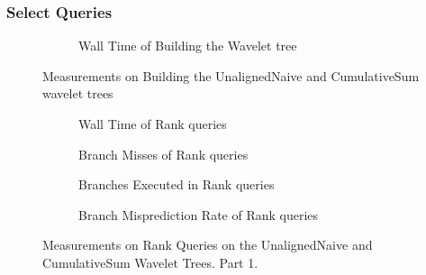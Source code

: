 \subsubsection{Select Queries}



\begin{figure}\tiny
\begin{subfigure}{0.48\textwidth}

\caption{Wall Time of Building the Wavelet tree}
\label{fig:CumulativeSumBuildWalltime}
\end{subfigure}
\caption{Measurements on Building the UnalignedNaive and CumulativeSum wavelet trees}
\label{fig:CumulativeSumBuild}
\end{figure}


\begin{figure}\tiny

\begin{subfigure}{0.48\textwidth}
	
	\caption{Wall Time of Rank queries}
	\label{fig:CumulativeSumRankWalltime}
\end{subfigure}
\hfill
\begin{subfigure}{0.48\textwidth}
	
	\caption{Branch Misses of Rank queries}
	\label{fig:CumulativeSumRankBranchMiss}
\end{subfigure}

\begin{subfigure}{0.48\textwidth}
	
	\caption{Branches Executed in Rank queries}
	\label{fig:CumulativeSumRankBranchExe}
\end{subfigure}
\hfill
\begin{subfigure}{0.48\textwidth}
	
	\caption{Branch Misprediction Rate of Rank queries}
	\label{fig:CumulativeSumRankBranchMissRate}
\end{subfigure}

\caption{Measurements on Rank Queries on the UnalignedNaive and CumulativeSum Wavelet Trees. Part 1.}
\label{fig:CumulativeSumRank}
\end{figure}





